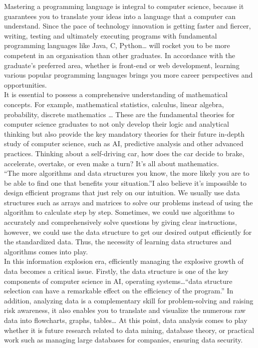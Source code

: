 \documentclass[a4paper, 11pt]{report}
\begin{document}
\noindent Mastering a programming language is integral to computer science, because it guarantees you to translate your ideas into a language that a computer can understand. Since the pace of technology innovation is getting faster and fiercer, writing, testing and ultimately executing programs with fundamental programming languages like Java, C, Python… will rocket you to be more competent in an organisation than other graduates. In accordance with the graduate's preferred area, whether is front-end or web development, learning various popular programming languages brings you more career perspectives and opportunities.\\

\noindent It is essential to possess a comprehensive understanding of mathematical concepts. For example, mathematical statistics, calculus, linear algebra, probability, discrete mathematics … These are the fundamental theories for computer science graduates to not only develop their logic and analytical thinking but also provide the key mandatory theories for their future in-depth study of computer science, such as AI, predictive analysis and other advanced practices. Thinking about a self-driving car, how does the car decide to brake, accelerate, overtake, or even make a turn? It’s all about mathematics.\\

\noindent “The more algorithms and data structures you know, the more likely you are to be able to find one that benefits your situation.”I also believe it’s impossible to design efficient programs that just rely on our intuition. We usually use data structures such as arrays and matrices to solve our problems instead of using the algorithm to calculate step by step. Sometimes, we could use algorithms to accurately and comprehensively solve questions by giving clear instructions, however, we could use the data structure to get our desired output efficiently for the standardized data. Thus, the necessity of learning data structures and algorithms comes into play.\\

\noindent In this information explosion era, efficiently managing the explosive growth of data becomes a critical issue. Firstly, the data structure is one of the key components of computer science in AI, operating systems…“data structure selection can have a remarkable effect on the efficiency of the program.” In addition, analyzing data is a complementary skill for problem-solving and raising risk awareness, it also enables you to translate and visualize the numerous raw data into flowcharts, graphs, tables… At this point, data analysis comes to play whether it is future research related to data mining, database theory, or practical work such as managing large databases for companies, ensuring data security.\\
\end{document}
